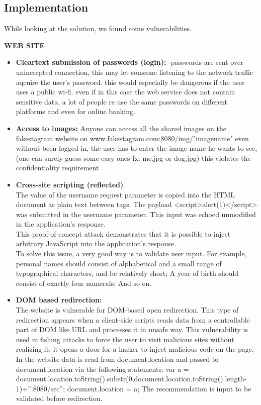 \subsection{Implementation}

While looking at the solution, we found some vulnerabilities. \\

\begin{center}
\textbf{WEB SITE}
\end{center}
\begin{itemize}  
\item \textbf{Cleartext submission of passwords (login):}
-passwords are sent over unincrepted connection, this may let someone listening to the network traffic aqcuire the user's password.
this would especially be dangerous if the user uses a public wi-fi.
even if in this case the web service does not contain sensitive data, a lot of people re use the same passwords on different platforms and even for online banking.

\item \textbf{Access to images:}
Anyone can access all the shared images on the fakestagram website on www.fakestagram.com:8080/img/"imagename" even without been logged in, the user has to enter the image name he wants to see,(one can surely guess some easy ones fx: me.jpg or dog.jpg)
this violates the confidentiality requirement


\item \textbf{Cross-site scripting (reflected)} \\

The value of the username request parameter is copied into the HTML document as plain text between tags. The payload <script>alert(1)</script> was submitted in the username parameter. This input was echoed unmodified in the application's response. \\

This proof-of-concept attack demonstrates that it is possible to inject arbitrary JavaScript into the application's response. \\

To solve this issue, a very good way is to validate user input. For example, personal names should consist of alphabetical and a small range of typographical characters, and be relatively short; A year of birth should consist of exactly four numerals; And so on.

\item \textbf{DOM based redirection:}\\
The website is vulnerable for DOM-based open redirection. This type of redirection appears when a client-side scripts reads data from a controllable part of DOM like URL and processes it in unsafe way. This vulnerability is used in fishing attacks to force the user to visit malicious sites without realizing it; it opens a door for a hacker to inject malicious code on the page. In the website data is read from document.location and passed to document.location via the following statements: var a = document.location.toString().substr(0,document.location.toString().length-
1)+”:8080/sec”; document.location = a;
The recommendation is input to be validated before redirection.



\end{itemize}
